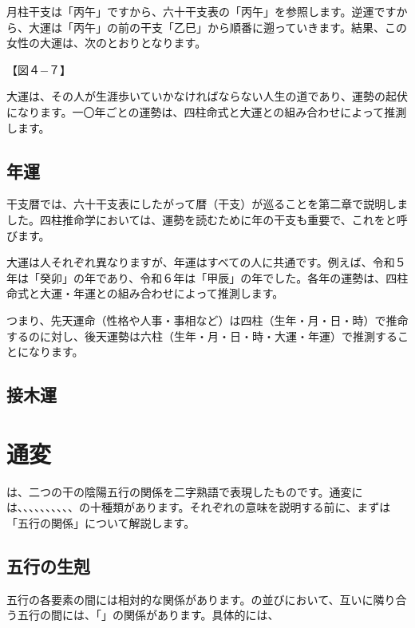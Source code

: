 \documentclass[a5paper,11pt,dvipdfmx]{tarticle}
\begin{document}
月柱干支は「丙午」ですから、六十干支表の「丙午」を参照します。逆運ですから、大運は「丙午」の前の干支「乙巳」から順番に遡っていきます。結果、この女性の大運は、次のとおりとなります。

【図４−７】

大運は、その人が生涯歩いていかなければならない人生の道であり、運勢の起伏になります。一〇年ごとの運勢は、四柱命式と大運との組み合わせによって推測します。

\subsection{年運}
干支暦では、六十干支表にしたがって暦（干支）が巡ることを第二章で説明しました。四柱推命学においては、運勢を読むために年の干支も重要で、これをと呼びます。

大運は人それぞれ異なりますが、年運はすべての人に共通です。例えば、令和５年は「癸卯」の年であり、令和６年は「甲辰」の年でした。各年の運勢は、四柱命式と大運・年運との組み合わせによって推測します。

つまり、先天運命（性格や人事・事相など）は四柱（生年・月・日・時）で推命するのに対し、後天運勢は六柱（生年・月・日・時・大運・年運）で推測することになります。

\subsection{接木運}

\clearpage

\section{通変}

は、二つの干の陰陽五行の関係を二字熟語で表現したものです。通変には、、、、、、、、、、の十種類があります。それぞれの意味を説明する前に、まずは「五行の関係」について解説します。

\subsection{五行の生剋}
五行の各要素の間には相対的な関係があります。の並びにおいて、互いに隣り合う五行の間には、「」の関係があります。具体的には、
\end{document}
